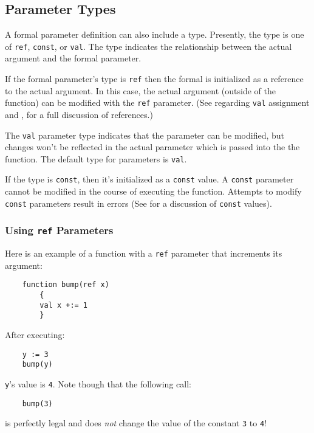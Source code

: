 \subsection{Parameter Types}

A formal parameter definition can also include a type.  Presently,
the type is one of {\tt ref}, {\tt const}, or {\tt val}.
The type indicates the relationship between the actual argument and
the formal parameter.

If the formal parameter's type is {\tt ref}
then the formal is initialized as a reference to the actual
argument.  In this case, the actual argument (outside of the function)
can be modified with the {\tt ref} parameter. (See  regarding {\tt val}
assignment and , for a full discussion of references.)

The {\tt val} parameter type indicates that the parameter can be modified,
but changes won't be reflected in the actual parameter which is passed into
the the function. The default type for parameters is {\tt val}.

If the type is {\tt const}, then it's initialized as
a {\tt const} value. A {\tt const} parameter cannot be modified in the
course of executing the function. Attempts to modify {\tt const} parameters
result in errors (See  for a discussion of {\tt const}
values).

\subsubsection{Using {\tt ref} Parameters} 
Here is an example of a function with a {\tt ref} parameter that
increments its argument:
\begin{verbatim}
    function bump(ref x)
        {
        val x +:= 1
        }
\end{verbatim}
After executing:
\begin{verbatim}
    y := 3
    bump(y)
\end{verbatim}
{\tt y}'s value is {\tt 4}.  Note though that the following call:
\begin{verbatim}
    bump(3)
\end{verbatim}
is perfectly legal and does {\em not} change the value of the
constant {\tt 3} to {\tt 4}!

